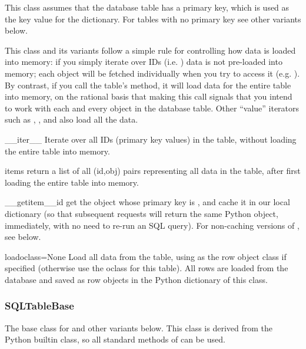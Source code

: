 \documentclass{howto}
\begin{document}
This class assumes that the database table has a primary key,
which is used as the key value for the dictionary.  For tables
with no primary key see other variants below.

This class and its variants follow a simple rule for controlling
how data is loaded into memory: if you simply iterate over IDs
(i.e. ) data is not pre-loaded into memory;
each object will be fetched individually when you try to access it
(e.g. ).  By contrast, if you call the table's
 method, it will load data for the entire table into
memory, on the rational basis that making this call signals that you
intend to work with each and every object in the database table.  Other
``value'' iterators such as , ,
and  also load all the data.

\begin{funcdesc}{__iter__}{}
  Iterate over all IDs (primary key values) in the table,
  without loading the entire table into memory.
\end{funcdesc}

\begin{funcdesc}{items}{}
  return a list of all (id,obj) pairs representing all data in the table,
  after first loading the entire table into memory.
\end{funcdesc}

\begin{funcdesc}{__getitem__}{id}
  get the object whose primary key is , and cache it in
  our local dictionary (so that subsequent requests will return the
  same Python object, immediately, with no need to re-run an SQL query).
  For non-caching versions of , see below.
\end{funcdesc}


\begin{funcdesc}{load}{oclass=None}
  Load all data from the table, using  as the row object
  class if specified (otherwise use the oclass for this table).
  All rows are loaded from the database and saved as row objects
  in the Python dictionary of this class.
\end{funcdesc}

\subsubsection{SQLTableBase}
The base class for  and other variants below.
This class is derived from
the Python builtin  class, so all standard methods of 
can be used.
\end{document}
